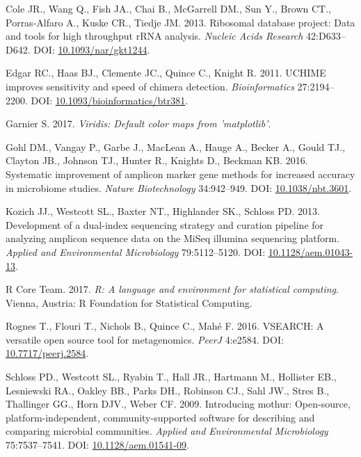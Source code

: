 \documentclass[12pt,]{article}
\begin{document}
\hypertarget{ref-rdp_Cole_2013}{}
Cole JR., Wang Q., Fish JA., Chai B., McGarrell DM., Sun Y., Brown CT.,
Porras-Alfaro A., Kuske CR., Tiedje JM. 2013. Ribosomal database
project: Data and tools for high throughput rRNA analysis. \emph{Nucleic
Acids Research} 42:D633--D642. DOI:
\href{https://doi.org/10.1093/nar/gkt1244}{10.1093/nar/gkt1244}.

\hypertarget{ref-uchime_Edgar_2011}{}
Edgar RC., Haas BJ., Clemente JC., Quince C., Knight R. 2011. UCHIME
improves sensitivity and speed of chimera detection.
\emph{Bioinformatics} 27:2194--2200. DOI:
\href{https://doi.org/10.1093/bioinformatics/btr381}{10.1093/bioinformatics/btr381}.

\hypertarget{ref-viridis_citation_2017}{}
Garnier S. 2017. \emph{Viridis: Default color maps from 'matplotlib'}.

\hypertarget{ref-taq_Gohl_2016}{}
Gohl DM., Vangay P., Garbe J., MacLean A., Hauge A., Becker A., Gould
TJ., Clayton JB., Johnson TJ., Hunter R., Knights D., Beckman KB. 2016.
Systematic improvement of amplicon marker gene methods for increased
accuracy in microbiome studies. \emph{Nature Biotechnology} 34:942--949.
DOI: \href{https://doi.org/10.1038/nbt.3601}{10.1038/nbt.3601}.

\hypertarget{ref-protocol_Kozich_2013}{}
Kozich JJ., Westcott SL., Baxter NT., Highlander SK., Schloss PD. 2013.
Development of a dual-index sequencing strategy and curation pipeline
for analyzing amplicon sequence data on the MiSeq illumina sequencing
platform. \emph{Applied and Environmental Microbiology} 79:5112--5120.
DOI: \href{https://doi.org/10.1128/aem.01043-13}{10.1128/aem.01043-13}.

\hypertarget{ref-r_citation_2017}{}
R Core Team. 2017. \emph{R: A language and environment for statistical
computing}. Vienna, Austria: R Foundation for Statistical Computing.

\hypertarget{ref-vsearch_Rognes_2016}{}
Rognes T., Flouri T., Nichols B., Quince C., Mahé F. 2016. VSEARCH: A
versatile open source tool for metagenomics. \emph{PeerJ} 4:e2584. DOI:
\href{https://doi.org/10.7717/peerj.2584}{10.7717/peerj.2584}.

\hypertarget{ref-mothur_schloss_2009}{}
Schloss PD., Westcott SL., Ryabin T., Hall JR., Hartmann M., Hollister
EB., Lesniewski RA., Oakley BB., Parks DH., Robinson CJ., Sahl JW.,
Stres B., Thallinger GG., Horn DJV., Weber CF. 2009. Introducing mothur:
Open-source, platform-independent, community-supported software for
describing and comparing microbial communities. \emph{Applied and
Environmental Microbiology} 75:7537--7541. DOI:
\href{https://doi.org/10.1128/aem.01541-09}{10.1128/aem.01541-09}.
\end{document}
